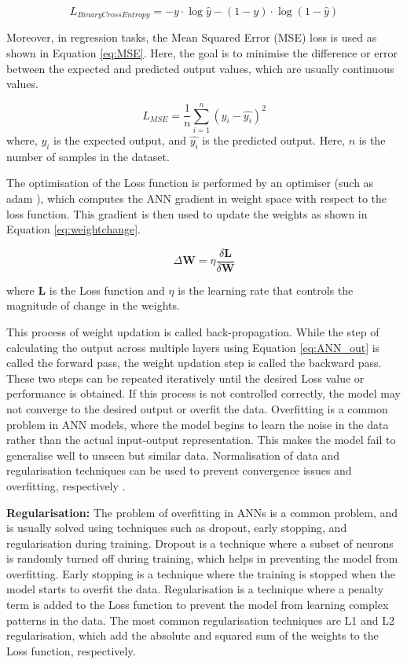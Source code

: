 \begin{equation}
 \label{eq:binarycrossentropy}
 L_{BinaryCrossEntropy} = -y \cdot \log{\hat{y}} - (1-y) \cdot \log{(1-\hat{y})}
\end{equation}


Moreover, in regression tasks, the Mean Squared Error (MSE) loss is used as shown in Equation \ref{eq:MSE}. Here, the goal is to minimise the difference or error between the expected and predicted output values, which are usually continuous values. 

\begin{equation}
 \label{eq:MSE}
 L_{MSE} = \frac{1}{n} \sum_{i=1}^{n}{(y_i - \hat{y_i})^2}
\end{equation}
where, $y_i$ is the expected output, and $\hat{y_i}$ is the predicted output. Here, $n$ is the number of samples in the dataset.

The optimisation of the Loss function is performed by an optimiser (such as \gls{adam} \cite{kingma2017adam}), which computes the ANN gradient in weight space with respect to the loss function. This gradient is then used to update the weights as shown in Equation \ref{eq:weightchange}.

\begin{equation}
 \label{eq:weightchange}
 \Delta \textbf{W} = \eta \frac{\delta \textbf{L}}{\delta \textbf{W}}
\end{equation}

where $\textbf{L}$ is the Loss function and $\eta$ is the learning rate that controls the magnitude of change in the weights.

This process of weight updation is called back-propagation. While the step of calculating the output across multiple layers using Equation \ref{eq:ANN_out} is called the forward pass, the weight updation step is called the backward pass. These two steps can be repeated iteratively until the desired Loss value or performance is obtained. If this process is not controlled correctly, the model may not converge to the desired output or overfit the data. Overfitting is a common problem in ANN models, where the model begins to learn the noise in the data rather than the actual input-output representation. This makes the model fail to generalise well to unseen but similar data. Normalisation of data and regularisation techniques can be used to prevent convergence issues and overfitting, respectively \cite{goodfellow_deep_2016}.


\textbf{Regularisation:} The problem of overfitting in ANNs is a common problem, and is usually solved using techniques such as dropout, early stopping, and regularisation during training. Dropout is a technique where a subset of neurons is randomly turned off during training, which helps in preventing the model from overfitting. Early stopping is a technique where the training is stopped when the model starts to overfit the data. Regularisation is a technique where a penalty term is added to the Loss function to prevent the model from learning complex patterns in the data. The most common regularisation techniques are L1 and L2 regularisation, which add the absolute and squared sum of the weights to the Loss function, respectively.

